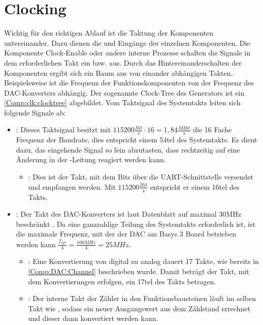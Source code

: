 \section{Clocking}
Wichtig für den richtigen Ablauf ist die Taktung der Komponenten untereinander.
Dazu dienen die  und  Eingänge der einzelnen Komponenten.
Die Komponente Clock-Enable oder andere interne Prozesse schalten die  Signale in dem erforderlichen Takt ein bzw. aus.
Durch das Hintereinanderschalten der Komponenten ergibt sich ein Baum aus von einander abhängigen Takten.
Beispielsweise ist die Frequenz der Funktionskomponenten von der Frequenz des DAC-Konverters abhängig.
Der sogenannte Clock-Tree des Generators ist ein \cref{Comp:clk:clocktree} abgebildet.
Vom Taktsignal des Systemtakts  leiten sich folgende Signale ab:
\begin{itemize}
\item {}: Dieses Taktsignal besitzt mit $115200 \frac{Bit}{s} \cdot 16 = 1,84 \frac{MBit}{s}$ die 16 Fache Frequenz der Baudrate, dies entspricht einem 54tel des Systemtakts.
  Es dient dazu, das eingehende Signal so fein abzutasten, dass rechtzeitig auf eine Änderung in der -Leitung reagiert werden kann.
    \begin{itemize}
      \item {}: Dies ist der Takt, mit dem Bits über die UART-Schnittstelle versendet und empfangen werden.
      Mit $115200 \frac{Bit}{s}$ entspricht er einem 16tel des  Takts.
    \end{itemize}
  \item {}: Der Takt des DAC-Konverters ist laut Datenblatt auf maximal 30MHz beschränkt \cite{DAC121S101}.
    Da eine ganzzahlige Teilung des Systemtakts erforderlich ist, ist die maximale Frequenz, mit der der DAC am Basys 3 Board betrieben werden kann $\frac{f_{sys}}{4} = \frac{100MHz}{4} = 25MHz$.
    \begin{itemize}
    \item {}: Eine Konvertierung von digital zu analog dauert 17 Takte, wie bereits in \cref{Comp:DAC:Channel} beschrieben wurde.
      Damit beträgt der Takt, mit dem Konvertierungen erfolgen, ein 17tel des  Takts betragen.
    \item {}: Der interne Takt der Zähler in den Funktionsbausteinen läuft im selben Takt wie , sodass ein neuer Ausgangswert aus dem Zählstand errechnet und dieser dann konvertiert werden kann.
    \end{itemize}
\end{itemize}

